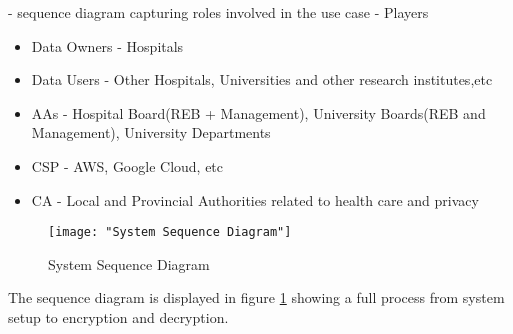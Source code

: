 - sequence diagram capturing roles involved in the use case
- Players
\begin{itemize}
	\item Data Owners - Hospitals
	\item Data Users - Other Hospitals, Universities and other research institutes,etc
	\item AAs - Hospital Board(REB + Management), University Boards(REB and Management), University Departments
	\item CSP - AWS, Google Cloud, etc
	\item CA - Local and Provincial Authorities related to health care and privacy
\end{itemize}


\begin{figure}[h]
	\centering
	\texttt{[image: "System Sequence Diagram"]}
	\caption{System Sequence Diagram}
	\label{fig:sysseq}
\end{figure}

The sequence diagram is displayed in figure \ref{fig:sysseq} showing a full process from system setup to encryption and decryption.